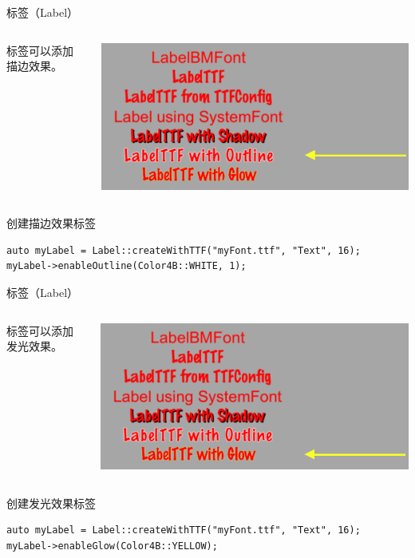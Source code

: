 \documentclass{beamer}
\begin{document}

\begin{frame}[fragile]{标签（Label）}
\begin{columns}
\begin{column}{0.4\textwidth}
标签可以添加描边效果。
\end{column}
\begin{column}{0.6\textwidth}
\includegraphics[width=\textwidth]
{figures/label_5}
\end{column}
\end{columns}
\begin{block}{创建描边效果标签}
\begin{verbatim}
auto myLabel = Label::createWithTTF("myFont.ttf", "Text", 16);
myLabel->enableOutline(Color4B::WHITE, 1);
\end{verbatim}
\end{block}
\end{frame}


\begin{frame}[fragile]{标签（Label）}
\begin{columns}
\begin{column}{0.4\textwidth}
标签可以添加发光效果。
\end{column}
\begin{column}{0.6\textwidth}
\includegraphics[width=\textwidth]
{figures/label_6}
\end{column}
\end{columns}
\begin{block}{创建发光效果标签}
\begin{verbatim}
auto myLabel = Label::createWithTTF("myFont.ttf", "Text", 16);
myLabel->enableGlow(Color4B::YELLOW);
\end{verbatim}
\end{block}
\end{frame}
\end{document}
